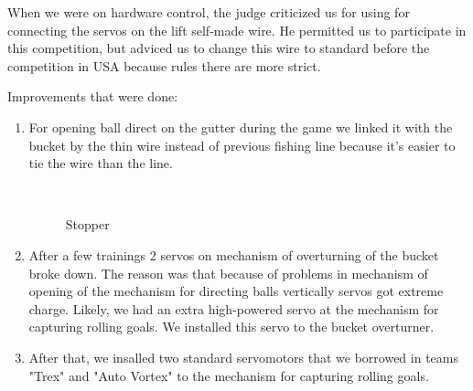 When we were on hardware control, the judge criticized us for using for connecting the servos on the lift self-made wire. He permitted us to participate in this competition, but adviced us to change this wire to standard before the competition in USA because rules there are more strict.

Improvements that were done:
\begin{enumerate}
	\item For opening ball direct on the gutter during the game we linked it with the bucket by the thin wire instead of previous fishing line because it's easier to tie the wire than the line.
	\begin{figure}[H]
		\begin{minipage}[h]{0.2\linewidth}
			\center  
		\end{minipage}
		\begin{minipage}[h]{0.6\linewidth}
			\caption{Stopper}
		\end{minipage}
	\end{figure}
	
	\item After a few trainings 2 servos on mechanism of overturning of the bucket broke down. The reason was that because of problems in mechanism of opening of the mechanism for directing balls vertically servos got extreme charge. Likely, we had an extra high-powered servo at the mechanism for capturing rolling goals. We installed this servo to the bucket overturner. 
	
	\item After that, we insalled two standard servomotors that we borrowed in teams "Trex" and "Auto Vortex" to the mechanism for capturing rolling goals.
	

\end{enumerate}
